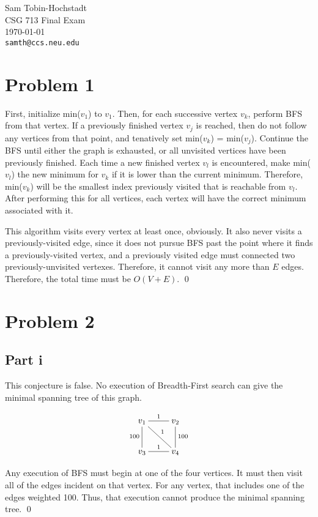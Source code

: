 \documentclass[twoside]{amsart}
\begin{document}
{\raggedleft
Sam Tobin-Hochstadt \\
CSG 713 Final Exam \\
\today \\
{\tt samth@ccs.neu.edu} \\
}


\section*{Problem 1}

First, initialize min($v_1$) to $v_1$.  Then, for each successive
vertex $v_k$, perform BFS from that vertex.  If a previously finished
vertex $v_j$ is reached, then do not follow any vertices from that
point, and tenatively set min($v_k$) = min($v_j$). Continue the BFS
until either the graph is exhausted, or all unvisited vertices have
been previously finished.  Each time a new finished vertex $v_l$ is
encountered, make min($v_l$) the new minimum for $v_k$ if it is lower
than the current minimum.  Therefore, min($v_k$) will be the smallest
index previously visited that is reachable from $v_l$. After
performing this for all vertices, each vertex will have the correct
minimum associated with it.


This algorithm visits every vertex at least once, obviously.  It also
never visits a previously-visited edge, since it does not pursue BFS
past the point where it finds a previously-visited vertex, and a
previously visited edge must connected two previously-unvisited
vertexes.  Therefore, it cannot visit any more than $E$ edges.
Therefore, the total time must be $O(V+E)$. \qed

\section*{Problem 2}

\subsection*{Part i}
This conjecture is false.  No execution of Breadth-First search can
give the minimal spanning tree of this graph.

\[\xymatrix{
  v_1 \ar@{-}[d]_{100} \ar@{-}[r]^1 \ar@{-}[dr]^1 & v_2 \ar@{-}[d]^{100} \\
  v_3 \ar@{-}[r]^1 & v_4
}\]

Any execution of BFS must begin at one of the four vertices.  It must
then visit all of the edges incident on that vertex.  For any vertex,
that includes one of the edges weighted 100.  Thus, that execution
cannot produce the minimal spanning tree. \qed
\end{document}
